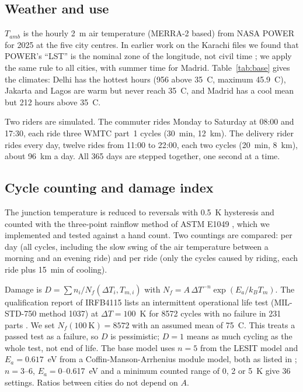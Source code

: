 \documentclass[conference]{IEEEtran}
\begin{document}
\subsection{Weather and use}
$T_{amb}$ is the hourly 2~m air temperature (MERRA-2 based) from NASA POWER
\cite{nasapower} for 2025 at the five city centres. In earlier work on the
Karachi files we found that POWER's ``LST'' is the nominal zone of the
longitude, not civil time \cite{gillani2026}; we apply the same rule to all
cities, with summer time for Madrid. Table~\ref{tab:base} gives the
climates: Delhi has the hottest hours (956 above 35~\textdegree C, maximum
45.9~\textdegree C), Jakarta and Lagos are warm but never reach
35~\textdegree C, and Madrid has a cool mean but 212 hours above
35~\textdegree C.

Two riders are simulated. The commuter rides Monday to Saturday at 08:00 and
17:30, each ride three WMTC part~1 cycles (30~min, 12~km). The delivery rider
rides every day, twelve rides from 11:00 to 22:00, each two cycles (20~min,
8~km), about 96~km a day. All 365 days are stepped together, one second at
a time.

\subsection{Cycle counting and damage index}
The junction temperature is reduced to reversals with 0.5~K hysteresis and
counted with the three-point rainflow method of ASTM E1049 \cite{astm1049},
which we implemented and tested against a hand count. Two countings are
compared: per day (all cycles, including the slow swing of the air
temperature between a morning and an evening ride) and per ride (only the
cycles caused by riding, each ride plus 15~min of cooling).

Damage is $D=\sum n_i/N_f(\Delta T_i,T_{m,i})$ with
$N_f=A\,\Delta T^{-n}\exp(E_a/k_BT_m)$. The qualification report of
IRFB4115 lists an intermittent operational life test (MIL-STD-750 method
1037) at $\Delta T=100$~K for 8572 cycles with no failure in 231 parts
\cite{infineonqual}. We set $N_f(100~\text{K})=8572$ with an assumed mean of
75~\textdegree C. This treats a passed test as a failure, so $D$ is
pessimistic; $D=1$ means as much cycling as the whole test, not end of life.
The base model uses $n=5$ from the LESIT model and $E_a=0.617$~eV from a
Coffin-Manson-Arrhenius module model, both as listed in \cite{wang2025}; $n=3$--6, $E_a=0$--0.617~eV and a minimum counted
range of 0, 2 or 5~K give 36 settings. Ratios between cities do not depend
on $A$.
\end{document}

